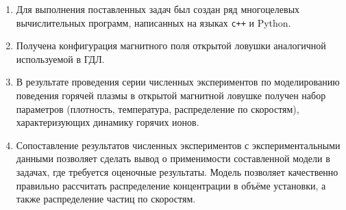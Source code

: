 \begin{enumerate}
  \item Для выполнения поставленных задач был создан ряд многоцелевых вычислительных программ, написанных на языках \texttt{c++} и Python.
  \item Получена конфигурация магнитного поля открытой ловушки аналогичной используемой в ГДЛ.
  \item В результате проведения серии численных экспериментов по моделированию поведения горячей плазмы в открытой магнитной ловушке получен набор параметров (плотность, температура, распределение по скоростям), характеризующих динамику горячих ионов.
  \item Сопоставление результатов численных экспериментов с экспериментальными данными позволяет сделать вывод о применимости составленной модели в задачах, где требуется оценочные результаты. Модель позволяет качественно правильно рассчитать распределение концентрации в объёме установки, а также распределение частиц по скоростям.
\end{enumerate}
